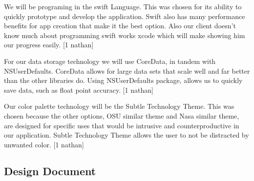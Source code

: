 \documentclass[onecolumn, draftclsnofoot,10pt, compsoc]{IEEEtran}
\begin{document}
We will be programing in the swift Language.
This was chosen for its ability to quickly prototype and develop the application.
Swift also has many performance benefits for app creation that make it the best option.
Also our client doesn't know much about programming swift works xcode which will make showing him our progress easily. [1 nathan]

For our data storage technology we will use CoreData, in tandem with NSUserDefaults.
CoreData allows for large data sets that scale well and far better than the other libraries do.
Using NSUserDefaults package, allows us to quickly save data, such as float point accuracy. [1 nathan]

Our color palette technology will be the Subtle Technology Theme.
This was chosen because the other options, OSU similar theme and Nasa similar theme, are designed for specific uses that would be intrusive and counterproductive in our application.
Subtle Technology Theme allows the user to not be distracted by unwanted color.  [1 nathan]

\subsection{Design Document}
\end{document}
